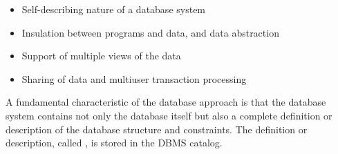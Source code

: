   \begin{itemize}
    \item Self-describing nature of a database system
    \item Insulation between programs and data, and data abstraction
    \item Support of multiple views of the data
    \item Sharing of data and multiuser transaction processing
  \end{itemize}
  
    \par A fundamental characteristic of the database approach is that the
      database system contains not only the database itself but also a
      complete definition or description of the database structure and
      constraints. The definition or description, called , is
      stored in the DBMS catalog.

